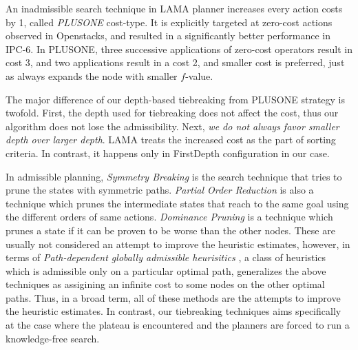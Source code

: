 An inadmissible search technique in LAMA planner \cite{richter2010lama}
increases every action costs by 1, called \emph{PLUSONE} cost-type.
It is explicitly targeted at zero-cost actions observed in Openstacks,
and resulted in a significantly better performance in IPC-6.
In PLUSONE, three successive
applications of zero-cost operators result in cost 3, and two
applications result in a cost 2, and smaller cost is preferred, just as
\astar always expands the node with smaller $f$-value.

The major difference of our depth-based tiebreaking from PLUSONE
strategy is twofold.  First, the depth used for tiebreaking does
not affect the cost, thus our algorithm does not lose the
admissibility. Next, \emph{we do not always favor smaller depth over
larger depth}. LAMA treats the increased cost as the part of
sorting criteria. In contrast, it happens only in FirstDepth configuration in our case.


In admissible planning,
\emph{Symmetry Breaking}
\cite{Fox1998,pochter2011exploiting,domshlak2013symmetry} is the search
technique that tries to prune the states with symmetric
paths. \emph{Partial Order Reduction}
is also a technique which prunes the
intermediate states that reach to the same goal using the different
orders of same actions. \emph{Dominance Pruning} \cite{hall2013faster} is a
technique which prunes a state if it can be proven to be worse than the other nodes.
% 
These are usually not considered an attempt to improve the heuristic
estimates, however, in terms of \emph{Path-dependent globally admissible
heurisitics} \cite{karpas2012optimal}, a class of heuristics which is
admissible only on a particular optimal path, generalizes the above
techniques as assigining an infinite cost to some nodes on the other optimal paths.
% 
Thus, in a broad term, all of these methods are the
attempts to improve the heuristic estimates.
In contrast, our tiebreaking techniques aims specifically at the case
where the plateau is encountered and the planners are forced to run a
knowledge-free search.

